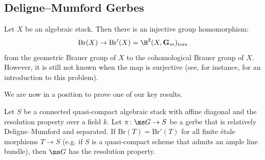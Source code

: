 \documentclass[reqno,a4paper]{amsart}
\numberwithin{Theorem}{section}
\theoremstyle{plain}
\theoremstyle{remark}
\begin{document}
\subsection{Deligne--Mumford Gerbes}
Let $X$ be an algebraic stack. Then there is an injective group homomorphism:
\[
  \mathrm{Br}(X) \to \mathrm{Br}'(X)=\H^2(X,\mathbf{G}_m)_{\text{tors}}
\]
from the geometric Brauer group of $X$ to the cohomological Brauer group of $X$. However, it is still not known when the map is surjective (see, for instance, \cite{mathur2020experiments} for an introduction to this problem).

We are now in a position to prove one of
our key results.
\begin{Theorem}\label{T:DM-gerbes}
  Let $S$ be a connected quasi-compact algebraic stack with
  affine diagonal and the resolution property over a field $k$. Let
  $\pi \colon \ms G \to S$ be a gerbe that is relatively
  Deligne--Mumford and separated. If
  $\mathrm{Br}(T)=\mathrm{Br}'(T)$ for all finite
  \'etale morphisms $T\to S$ (e.g. if $S$ is a quasi-compact scheme that admits
  an ample line bundle), then $\ms G$ has the resolution property.
\end{Theorem}
\end{document}

